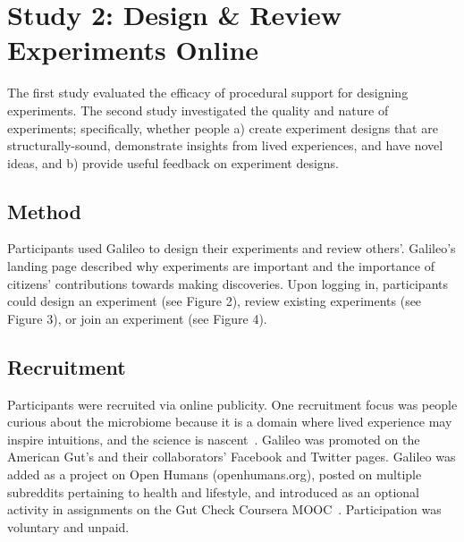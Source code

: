 \section{Study 2: Design \& Review Experiments Online}
The first study evaluated the efficacy of procedural support for designing experiments. The second study investigated the quality and nature of experiments; specifically, whether people a) create experiment designs that are structurally-sound, demonstrate insights from lived experiences, and have novel ideas, and b) provide useful feedback on experiment designs. 

\subsection{Method}
Participants used Galileo to design their experiments and review others’. Galileo’s landing page described why experiments are important and the importance of citizens’ contributions towards making discoveries. Upon logging in, participants could design an experiment (see Figure 2), review existing experiments (see Figure 3), or join an experiment (see Figure 4). 

\subsection{Recruitment}
Participants were recruited via online publicity. One recruitment focus was people curious about the microbiome because it is a domain where lived experience may inspire intuitions, and the science is nascent~\cite{McDonald2018a}. Galileo was promoted on the American Gut’s and their collaborators’ Facebook and Twitter pages. Galileo was added as a project on Open Humans (openhumans.org), posted on multiple subreddits pertaining to health and lifestyle, and introduced as an optional activity in assignments on the Gut Check Coursera MOOC~\cite{Knight2016}. Participation was voluntary and unpaid. 


